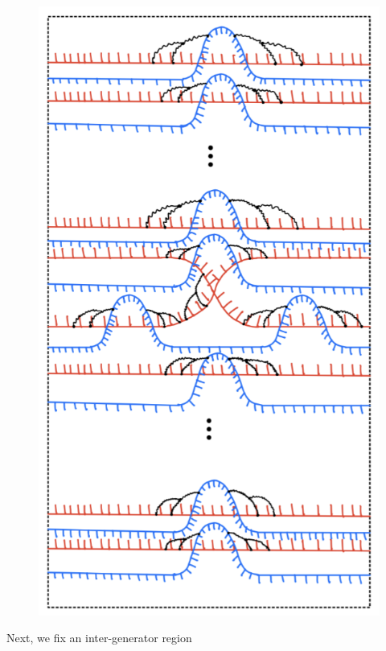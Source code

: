 \begin{definition}
\begin{figure}[H] 
    \centering
    \includegraphics[scale = 0.95]{diagrams/local_systems_on_as_diagrams/13.png}
    \caption{}
    \label{fig:your-label}
\end{figure}
\end{definition}
Next, we fix an inter-generator region
